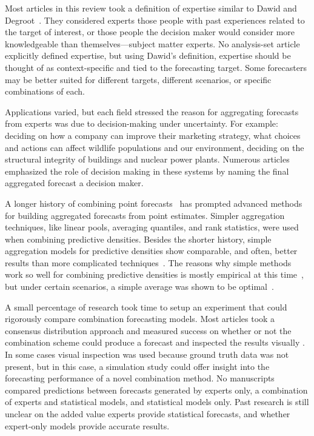 \documentclass[preprint,authoryear]{elsarticle}
\begin{document}
Most articles in this review took a definition of expertise similar to Dawid and Degroot~\cite{dawid1995coherent}.
They considered experts those people with past experiences related to the target of interest, or those people the decision maker would consider more knowledgeable than themselves---subject matter experts.
No analysis-set article explicitly defined expertise, but using Dawid's definition, expertise should be thought of as context-specific and tied to the forecasting target.
Some forecasters may be better suited for different targets, different scenarios, or specific combinations of each.

Applications varied, but each field stressed the reason for aggregating forecasts from experts was due to decision-making under uncertainty. 
For example: deciding on how a company can improve their marketing strategy, what choices and actions can affect wildlife populations and our environment, deciding on the structural integrity of buildings and nuclear power plants.
Numerous articles emphasized the role of decision making in these systems by naming the final aggregated forecast a decision maker.

A longer history of combining point forecasts~\citep{galton1907vox,bates1969combination,granger1984improved} has prompted advanced methods for building aggregated forecasts from point estimates. 
Simpler aggregation techniques, like linear pools, averaging quantiles, and rank statistics, were used when combining predictive densities.
Besides the shorter history, simple aggregation models for predictive densities show comparable, and often, better results than more complicated techniques~\citep{clemen1989combining,rantilla1999aggregation}.
The reasons why simple methods work so well for combining predictive densities is mostly empirical at this time~\citep{makridakis1983averages,clemen1989combining,rantilla1999aggregation}, but under certain scenarios, a simple average was shown to be optimal~\cite{wallsten1997evaluating,wallsten1997combining}.

A small percentage of research took time to setup an experiment that could rigorously compare combination forecasting models.
Most articles took a consensus distribution approach and measured success on whether or not the combination scheme could produce a forecast and inspected the results visually .
In some cases visual inspection was used because ground truth data was not present, but in this case, a simulation study could offer insight into the forecasting performance of a novel combination method.
No manuscripts compared predictions between forecasts generated by experts only, a combination of experts and statistical models, and statistical models only.
Past research is still unclear on the added value experts provide statistical forecasts, and whether expert-only models provide accurate results.
\end{document}
